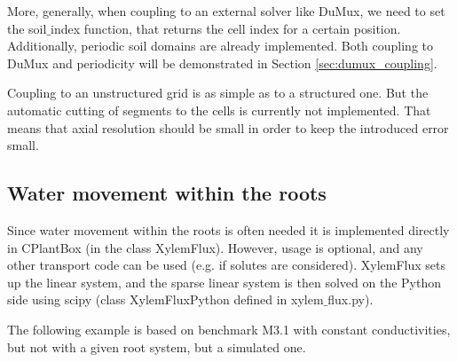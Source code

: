 More, generally, when coupling to an external solver like DuMux, we need to set the soil$\_$index function, that returns the cell index for a certain position. Additionally, periodic soil domains are already implemented. Both coupling to DuMux and periodicity will be demonstrated in Section \ref{sec:dumux_coupling}.

Coupling to an unstructured grid is as simple as to a structured one. But the automatic cutting of segments to the cells is currently not implemented. That means that axial resolution should be small in order to keep the introduced error small.



\subsection{Water movement within the roots} \label{ssec:xylem}

Since water movement within the roots is often needed it is implemented directly in CPlantBox (in the class XylemFlux). However, usage is optional, and any other transport code can be used (e.g. if solutes are considered). XylemFlux sets up the linear system, and the sparse linear system is then solved on the Python side using scipy (class XylemFluxPython defined in xylem$\_$flux.py).

The following example is based on benchmark M3.1 with constant conductivities, but not with a given root system, but a simulated one.

